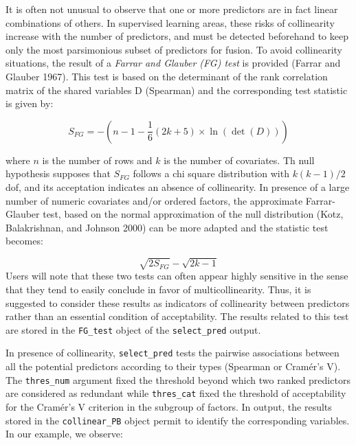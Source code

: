 It is often not unusual to observe that one or more predictors are in fact linear combinations of others. In
supervised learning areas, these risks of collinearity increase with the number of predictors, and must be detected beforehand to keep only the most parsimonious subset of predictors for fusion. To avoid collinearity situations, the result of a \emph{Farrar and Glauber (FG) test} is provided (Farrar and Glauber 1967). This test is based on the determinant of the rank correlation matrix of the shared variables D (Spearman) and the corresponding test statistic is given by:

\[
S_{FG} = - \left(n-1-\frac{1}{6} (2k+5)\times \ln(\det(D))\right)
\]

where \(n\) is the number of rows and \(k\) is the number of covariates. Th null hypothesis supposes that
\(S_{FG}\) follows a chi square distribution with \(k(k-1)/2\) dof, and its acceptation indicates an absence of collinearity. In presence of a large number of numeric covariates and/or ordered factors, the approximate Farrar-Glauber test, based on the normal approximation of the null distribution (Kotz, Balakrishnan, and Johnson 2000) can be more adapted and the statistic test becomes:

\[
\sqrt{2S_{FG}} - \sqrt{2k-1}
\]
Users will note that these two tests can often appear highly sensitive in the sense that they tend to easily conclude in favor of multicollinearity. Thus, it is suggested to consider these results as indicators of collinearity between predictors rather than an essential condition of acceptability. The results related to this test are stored in the \texttt{FG\_test} object of the \texttt{select\_pred} output.

In presence of collinearity, \texttt{select\_pred} tests the pairwise associations between all the potential predictors according to their types (Spearman or Cramér's V). The \texttt{thres\_num} argument fixed the threshold beyond which two ranked predictors are considered as redundant while \texttt{thres\_cat} fixed the threshold of acceptability for the Cramér's V criterion in the subgroup of factors. In output, the results stored in the \texttt{collinear\_PB} object permit to identify the corresponding variables. In our example, we observe:

